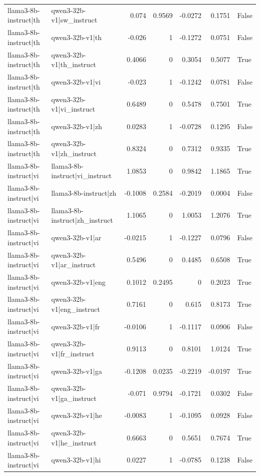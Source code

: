 \begin{table}
\begin{tabular}{l l r r r r l}
llama3-8b-instruct|th & qwen3-32b-v1|sw_instruct & 0.074 & 0.9569 & -0.0272 & 0.1751 & False \\
llama3-8b-instruct|th & qwen3-32b-v1|th & -0.026 & 1 & -0.1272 & 0.0751 & False \\
llama3-8b-instruct|th & qwen3-32b-v1|th_instruct & 0.4066 & 0 & 0.3054 & 0.5077 & True \\
llama3-8b-instruct|th & qwen3-32b-v1|vi & -0.023 & 1 & -0.1242 & 0.0781 & False \\
llama3-8b-instruct|th & qwen3-32b-v1|vi_instruct & 0.6489 & 0 & 0.5478 & 0.7501 & True \\
llama3-8b-instruct|th & qwen3-32b-v1|zh & 0.0283 & 1 & -0.0728 & 0.1295 & False \\
llama3-8b-instruct|th & qwen3-32b-v1|zh_instruct & 0.8324 & 0 & 0.7312 & 0.9335 & True \\
llama3-8b-instruct|vi & llama3-8b-instruct|vi_instruct & 1.0853 & 0 & 0.9842 & 1.1865 & True \\
llama3-8b-instruct|vi & llama3-8b-instruct|zh & -0.1008 & 0.2584 & -0.2019 & 0.0004 & False \\
llama3-8b-instruct|vi & llama3-8b-instruct|zh_instruct & 1.1065 & 0 & 1.0053 & 1.2076 & True \\
llama3-8b-instruct|vi & qwen3-32b-v1|ar & -0.0215 & 1 & -0.1227 & 0.0796 & False \\
llama3-8b-instruct|vi & qwen3-32b-v1|ar_instruct & 0.5496 & 0 & 0.4485 & 0.6508 & True \\
llama3-8b-instruct|vi & qwen3-32b-v1|eng & 0.1012 & 0.2495 & 0 & 0.2023 & True \\
llama3-8b-instruct|vi & qwen3-32b-v1|eng_instruct & 0.7161 & 0 & 0.615 & 0.8173 & True \\
llama3-8b-instruct|vi & qwen3-32b-v1|fr & -0.0106 & 1 & -0.1117 & 0.0906 & False \\
llama3-8b-instruct|vi & qwen3-32b-v1|fr_instruct & 0.9113 & 0 & 0.8101 & 1.0124 & True \\
llama3-8b-instruct|vi & qwen3-32b-v1|ga & -0.1208 & 0.0235 & -0.2219 & -0.0197 & True \\
llama3-8b-instruct|vi & qwen3-32b-v1|ga_instruct & -0.071 & 0.9794 & -0.1721 & 0.0302 & False \\
llama3-8b-instruct|vi & qwen3-32b-v1|he & -0.0083 & 1 & -0.1095 & 0.0928 & False \\
llama3-8b-instruct|vi & qwen3-32b-v1|he_instruct & 0.6663 & 0 & 0.5651 & 0.7674 & True \\
llama3-8b-instruct|vi & qwen3-32b-v1|hi & 0.0227 & 1 & -0.0785 & 0.1238 & False \\

\end{tabular}
\end{table}
